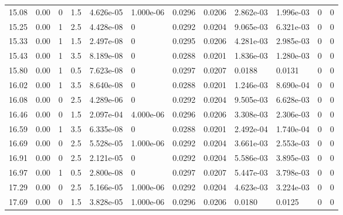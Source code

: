 \documentclass[preview]{standalone}
\begin{document}
{{{\begin{tabular}{L{1.2cm}C{1.2cm} C{0.3cm}C{0.5cm} C{1.4cm}C{1.4cm} C{1.4cm}C{1.4cm} C{1.6cm}C{1.6cm} C{1.6cm}C{1.6cm}}
  15.08  &  0.00  & 0     & 1.5 &  4.626e-05  & 1.000e-06  &  0.0296&   0.0206& 2.862e-03 & 1.996e-03   &  0 & 0  \\ 
  15.25  &  0.00  & 1     & 2.5 &  4.428e-08  & 0  &  0.0292&   0.0204& 9.065e-03 & 6.321e-03   &  0 & 0  \\ 
  15.33  &  0.00  & 1     & 1.5 &  2.497e-08  & 0  &  0.0295&   0.0206& 4.281e-03 & 2.985e-03   &  0 & 0  \\ 
  15.43  &  0.00  & 1     & 3.5 &  8.189e-08  & 0  &  0.0288&   0.0201& 1.836e-03 & 1.280e-03   &  0 & 0  \\ 
  15.80  &  0.00  & 1     & 0.5 &  7.623e-08  & 0  &  0.0297&   0.0207& 0.0188 & 0.0131   &  0 & 0  \\ 
  16.02  &  0.00  & 1     & 3.5 &  8.640e-08  & 0  &  0.0288&   0.0201& 1.246e-03 & 8.690e-04   &  0 & 0  \\ 
  16.08  &  0.00  & 0     & 2.5 &  4.289e-06  & 0  &  0.0292&   0.0204& 9.505e-03 & 6.628e-03   &  0 & 0  \\ 
  16.46  &  0.00  & 0     & 1.5 &  2.097e-04  & 4.000e-06  &  0.0296&   0.0206& 3.308e-03 & 2.306e-03   &  0 & 0  \\ 
  16.59  &  0.00  & 1     & 3.5 &  6.335e-08  & 0  &  0.0288&   0.0201& 2.492e-04 & 1.740e-04   &  0 & 0  \\ 
  16.69  &  0.00  & 0     & 2.5 &  5.528e-05  & 1.000e-06  &  0.0292&   0.0204& 3.661e-03 & 2.553e-03   &  0 & 0  \\ 
  16.91  &  0.00  & 0     & 2.5 &  2.121e-05  & 0  &  0.0292&   0.0204& 5.586e-03 & 3.895e-03   &  0 & 0  \\ 
  16.97  &  0.00  & 1     & 0.5 &  2.800e-08  & 0  &  0.0297&   0.0207& 5.447e-03 & 3.798e-03   &  0 & 0  \\ 
  17.29  &  0.00  & 0     & 2.5 &  5.166e-05  & 1.000e-06  &  0.0292&   0.0204& 4.623e-03 & 3.224e-03   &  0 & 0  \\ 
  17.69  &  0.00  & 0     & 1.5 &  3.828e-05  & 1.000e-06  &  0.0296&   0.0206& 0.0180 & 0.0125   &  0 & 0  \\ 
\hline 
\end{tabular} 

}}}
\end{document}
